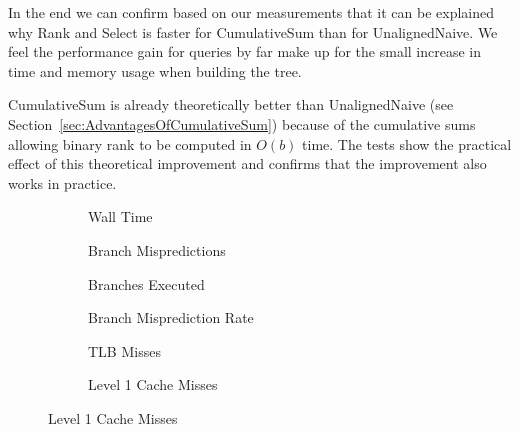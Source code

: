 In the end we can confirm based on our measurements that it can be explained why Rank and Select is faster for CumulativeSum than for UnalignedNaive.
We feel the performance gain for queries by far make up for the small increase in time and memory usage when building the tree.

CumulativeSum is already theoretically better than UnalignedNaive (see Section~\ref{sec:AdvantagesOfCumulativeSum}) because of the cumulative sums allowing binary rank to be computed in $O(b)$ time.
The tests show the practical effect of this theoretical improvement and confirms that the improvement also works in practice.



\begin{figure}\tiny

\begin{subfigure}{0.30\textwidth}
	
	\caption{Wall Time}
	\label{fig:CumulativeSumRankWalltime}
\end{subfigure}
\hfill
\begin{subfigure}{0.30\textwidth}
	
	\caption{Branch Mispredictions}
	\label{fig:CumulativeSumRankBranchMiss}
\end{subfigure}
\hfill
\begin{subfigure}{0.30\textwidth}
	
	\caption{Branches Executed}
	\label{fig:CumulativeSumRankBranchExe}
\end{subfigure}


\begin{subfigure}{0.30\textwidth}
	
	\caption{Branch Misprediction Rate}
	\label{fig:CumulativeSumRankBranchMissRate}
\end{subfigure}
\hfill
\begin{subfigure}{0.30\textwidth}
	
	\caption{TLB Misses}
	\label{fig:CumulativeSumRankTLBMiss}
\end{subfigure}
\hfill
\begin{subfigure}{0.30\textwidth}
	
	\caption{Level 1 Cache Misses}
	\label{fig:CumulativeSumRankL1CM}
\end{subfigure}


\end{figure}
